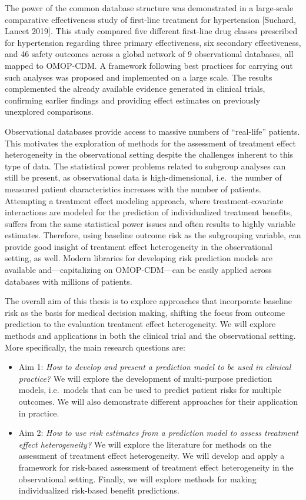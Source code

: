 \documentclass[
]{book}
\providecommand{\tightlist}{%
  \setlength{\itemsep}{0pt}\setlength{\parskip}{0pt}}
\begin{document}
The power of the common database structure was demonstrated in a large-scale
comparative effectiveness study of first-line treatment for hypertension
{[}Suchard, Lancet 2019{]}. This study compared five different first-line drug
classes prescribed for hypertension regarding three primary effectiveness, six
secondary effectiveness, and 46 safety outcomes across a global network of 9
observational databases, all mapped to OMOP-CDM. A framework following best
practices for carrying out such analyses was proposed and implemented on a large
scale. The results complemented the already available evidence generated in
clinical trials, confirming earlier findings and providing effect estimates on
previously unexplored comparisons.

Observational databases provide access to massive numbers of ``real-life''
patients. This motivates the exploration of methods for the assessment of
treatment effect heterogeneity in the observational setting despite the
challenges inherent to this type of data. The statistical power problems related
to subgroup analyses can still be present, as observational data is
high-dimensional, i.e.~the number of measured patient characteristics increases
with the number of patients. Attempting a treatment effect modeling approach,
where treatment-covariate interactions are modeled for the prediction of
individualized treatment benefits, suffers from the same statistical power
issues and often results to highly variable estimates. Therefore, using baseline
outcome risk as the subgrouping variable, can provide good insight of treatment
effect heterogeneity in the observational setting, as well. Modern libraries for
developing risk prediction models are available and---capitalizing on
OMOP-CDM---can be easily applied across databases with millions of patients.

The overall aim of this thesis is to explore approaches that incorporate
baseline risk as the basis for medical decision making, shifting the focus from
outcome prediction to the evaluation treatment effect heterogeneity. We will
explore methods and applications in both the clinical trial and the
observational setting. More specifically, the main research questions are:

\begin{itemize}
\tightlist
\item
  Aim 1: \emph{How to develop and present a prediction model to be used in clinical
  practice?} We will explore the development of multi-purpose prediction models,
  i.e.~models that can be used to predict patient risks for multiple
  outcomes. We will also demonstrate different approaches for their application
  in practice.
\item
  Aim 2: \emph{How to use risk estimates from a prediction model to assess treatment
  effect heterogeneity?} We will explore the literature for methods on the
  assessment of treatment effect heterogeneity. We will develop and apply a
  framework for risk-based assessment of treatment effect heterogeneity in the
  observational setting. Finally, we will explore methods for making
  individualized risk-based benefit predictions.
\end{itemize}
\end{document}
